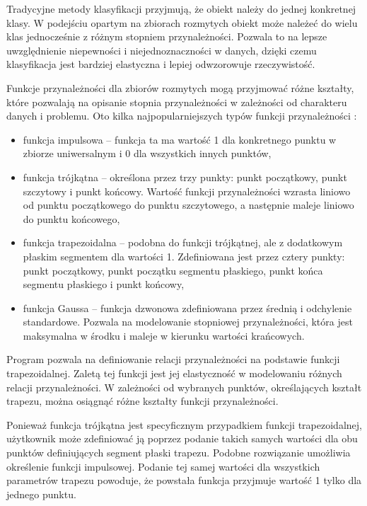 Tradycyjne metody klasyfikacji przyjmują, że obiekt należy do jednej konkretnej klasy. W podejściu
opartym na zbiorach rozmytych obiekt może należeć do wielu klas jednocześnie z różnym stopniem
przynależności. Pozwala to na lepsze uwzględnienie niepewności i niejednoznaczności w danych,
dzięki czemu klasyfikacja jest bardziej elastyczna i lepiej odwzorowuje rzeczywistość.

Funkcje przynależności dla zbiorów rozmytych mogą przyjmować różne kształty, które pozwalają na opisanie
stopnia przynależności w zależności od charakteru danych i problemu. Oto kilka najpopularniejszych
typów funkcji przynależności \cite{fuzzy-sets}:
\begin{itemize}
	\item funkcja impulsowa -- funkcja ta ma wartość 1 dla konkretnego punktu w zbiorze uniwersalnym i
	      0 dla wszystkich innych punktów,
	\item funkcja trójkątna -- określona przez trzy punkty: punkt początkowy, punkt szczytowy i
	      punkt końcowy. Wartość funkcji przynależności wzrasta liniowo od punktu początkowego do punktu
	      szczytowego, a następnie maleje liniowo do punktu końcowego,
	\item funkcja trapezoidalna -- podobna do funkcji trójkątnej, ale z dodatkowym płaskim segmentem dla
	      wartości 1. Zdefiniowana jest przez cztery punkty: punkt początkowy, punkt początku segmentu
	      płaskiego, punkt końca segmentu płaskiego i punkt końcowy,
	\item funkcja Gaussa -- funkcja dzwonowa zdefiniowana przez średnią i odchylenie standardowe.
	      Pozwala na modelowanie stopniowej przynależności, która jest maksymalna w środku i maleje w
	      kierunku wartości krańcowych.
\end{itemize}

Program pozwala na definiowanie relacji przynależności na podstawie funkcji trapezoidalnej. Zaletą tej
funkcji jest jej elastyczność w modelowaniu różnych relacji przynależności. W zależności od wybranych punktów,
określających kształt trapezu, można osiągnąć różne kształty funkcji przynależności.

Ponieważ funkcja trójkątna jest specyficznym przypadkiem funkcji trapezoidalnej, użytkownik może zdefiniować
ją poprzez podanie takich samych wartości dla obu punktów definiujących segment płaski trapezu. Podobne
rozwiązanie umożliwia określenie funkcji impulsowej. Podanie tej samej wartości dla wszystkich parametrów
trapezu powoduje, że powstała funkcja przyjmuje wartość 1 tylko dla jednego punktu.

